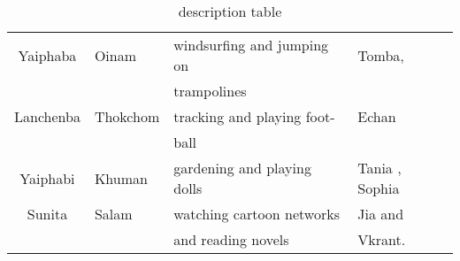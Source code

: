 \documentclass[12pt]{article}
\begin{document}
\begin{table}[h]
\caption{description table}
\centering
\begin{tabular}{c |l l l}
Yaiphaba & Oinam  & windsurfing \;and \;jumping \;on &Tomba,\\&&trampolines\\ 
Lanchenba & Thokchom & tracking \; and \;playing \;foot-&Echan \\&& ball \\
Yaiphabi & Khuman & gardening and playing dolls & Tania , Sophia \\
Sunita & Salam & watching \; cartoon \;networks & Jia \quad\quad\quad and \\&& and reading novels & Vkrant.
\end{tabular}
\end{table}
\end{document}
